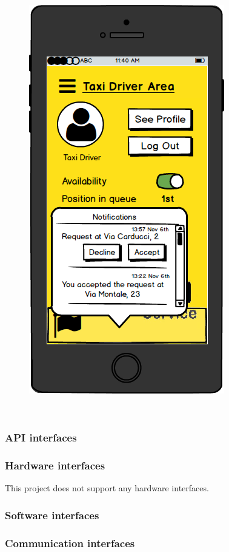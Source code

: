 \documentclass[18pt,oneside,a4paper, titlepage]{article}
\begin{document}
\begin{itemize}
				\begin{figure}[h]
					\centering
					\includegraphics[scale=0.3]{MobileAppTaxiDriverNotifications.png}
				\end{figure}
				\\
			\end{itemize}
		\subsubsection{API interfaces}
		\subsubsection{Hardware interfaces}
		This project does not support any hardware interfaces.
		\subsubsection{Software interfaces}
		\subsubsection{Communication interfaces}
\end{document}
